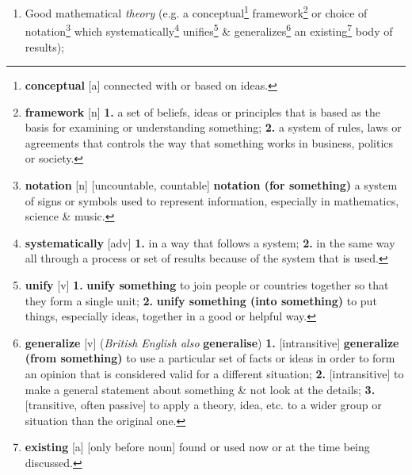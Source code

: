 \documentclass[oneside]{book}
\numberwithin{equation}{section}
\begin{document}
\begin{enumerate}
	\item Good mathematical \textit{theory} (e.g. a conceptual\footnote{\textbf{conceptual} [a] connected with or based on ideas.} framework\footnote{\textbf{framework} [n] \textbf{1.} a set of beliefs, ideas or principles that is based as the basis for examining or understanding something; \textbf{2.} a system of rules, laws or agreements that controls the way that something works in business, politics or society.} or choice of notation\footnote{\textbf{notation} [n] [uncountable, countable] \textbf{notation (for something)} a system of signs or symbols used to represent information, especially in mathematics, science \& music.} which systematically\footnote{\textbf{systematically} [adv] \textbf{1.} in a way that follows a system; \textbf{2.} in the same way all through a process or set of results because of the system that is used.} unifies\footnote{\textbf{unify} [v] \textbf{1.} \textbf{unify something} to join people or countries together so that they form a single unit; \textbf{2.} \textbf{unify something (into something)} to put things, especially ideas, together in a good or helpful way.} \& generalizes\footnote{\textbf{generalize} [v] (\textit{British English also} \textbf{generalise}) \textbf{1.} [intransitive] \textbf{generalize (from something)} to use a particular set of facts or ideas in order to form an opinion that is considered valid for a different situation; \textbf{2.} [intransitive] to make a general statement about something \& not look at the details; \textbf{3.} [transitive, often passive] to apply a theory, idea, etc. to a wider group or situation than the original one.} an existing\footnote{\textbf{existing} [a] [only before noun] found or used now or at the time being discussed.} body of results);

\end{enumerate}
\end{document}
